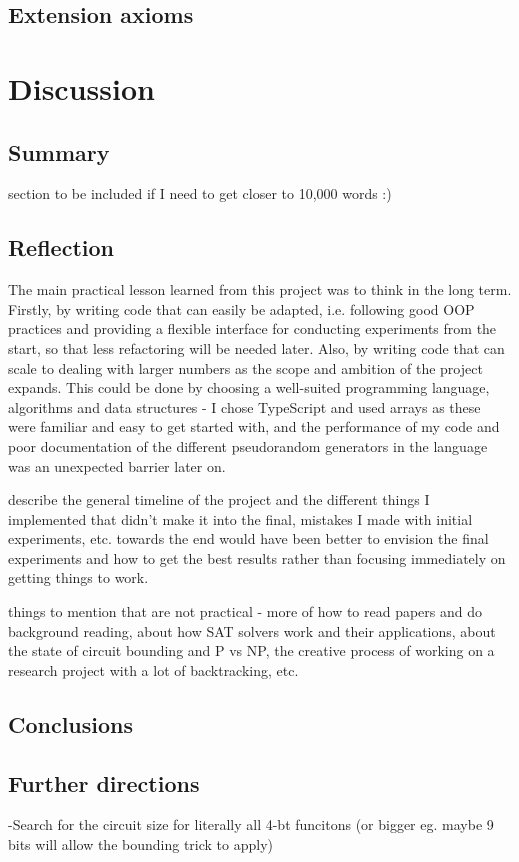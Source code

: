 \documentclass{article}
\begin{document}
\subsection{Extension axioms}

\section{Discussion}

\subsection{Summary}
section to be included if I need to get closer to 10,000 words :)

\subsection{Reflection}

The main practical lesson learned from this project was to think in the long term. Firstly, by writing code that can easily be adapted, i.e. following good OOP practices and providing a flexible interface for conducting experiments from the start, so that less refactoring will be needed later. Also, by writing code that can scale to dealing with larger numbers as the scope and ambition of the project expands. This could be done by choosing a well-suited programming language, algorithms and data structures - I chose TypeScript and used arrays as these were familiar and easy to get started with, and the performance of my code and poor documentation of the different pseudorandom generators in the language was an unexpected barrier later on.

describe the general timeline of the project and the different things I implemented that didn't make it into the final, mistakes I made with initial experiments, etc. towards the end would have been better to envision the final experiments and how to get the best results rather than focusing immediately on getting things to work.

things to mention that are not practical - more of how to read papers and do background reading, about how SAT solvers work and their applications, about the state of circuit bounding and P vs NP, the creative process of working on a research project with a lot of backtracking, etc.

\subsection{Conclusions}

\subsection{Further directions}
-Search for the circuit size for literally all 4-bt funcitons (or bigger eg. maybe 9 bits will allow the bounding trick to apply)

 

\end{document}
